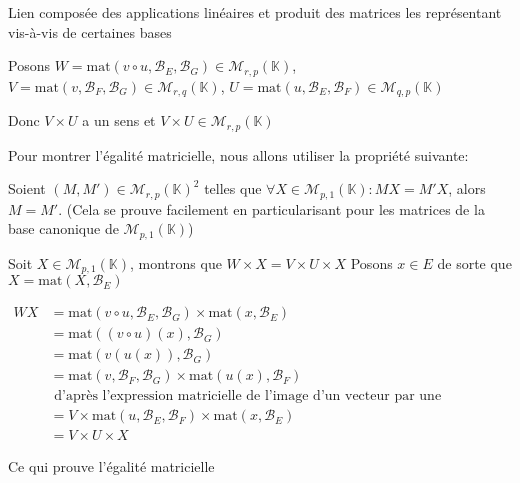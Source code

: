 \documentclass{article}
\begin{document}
\begin{question_kholle}
	[{Soient $E, F, G$, trois $\mathbb{K}$-espaces vectoriels de dimension finie $(p, q, r) \in (\mathbb{N}^{*})^{3}$
$\mathcal{B}_{E}, \mathcal{B}_{F}, \mathcal{B}_{G}$ des bases respectives de ces trois espaces vectoriels, et  $u \in \mathcal{L}_{\mathbb{K}}(E, F)$ $v \in \mathcal{L}_{\mathbb{K}}(F, G)$.
	
	Alors 
$$
	\mathrm{mat}(v \circ u, \mathcal{B}_{E}, \mathcal{B}_{G}) = \mathrm{mat}(v, \mathcal{B}_{F}, \mathcal{B}_{G}) \times \mathrm{mat}(u, \mathcal{B}_{E}, \mathcal{B}_{F})
$$}]{Lien composée des applications linéaires et produit des matrices les représentant vis-à-vis de certaines bases}
	
	Posons $W = \mathrm{mat}(v \circ u, \mathcal{B}_{E}, \mathcal{B}_{G}) \in \mathcal{M}_{r, p}(\mathbb{K})$, $V=\mathrm{mat}(v, \mathcal{B}_{F}, \mathcal{B}_{G}) \in \mathcal{M}_{r, q}(\mathbb{K})$, $U = \mathrm{mat}(u, \mathcal{B}_{E}, \mathcal{B}_{F}) \in \mathcal{M}_{q, p}(\mathbb{K})$
	
	Donc $V \times U$ a un sens et $V \times U \in \mathcal{M}_{r, p}(\mathbb{K})$
	
	Pour montrer l'égalité matricielle, nous allons utiliser la propriété suivante:
	
	Soient $(M, M') \in \mathcal{M}_{r, p}(\mathbb{K})^{2}$ telles que $\forall X \in \mathcal{M}_{p, 1}(\mathbb{K}): MX = M'X$, alors $M = M'$. (Cela se prouve facilement en particularisant pour les matrices de la base canonique de $\mathcal{M}_{p,1}(\mathbb{K})$)
	
	Soit $X \in \mathcal{M}_{p, 1}(\mathbb{K})$, montrons que $W \times X = V \times U \times X$
	Posons $x \in E$ de sorte que $X = \mathrm{mat}(X, \mathcal{B}_{E})$
	
	\begin{align*}
		WX &= \mathrm{mat}(v \circ  u, \mathcal{B}_{E}, \mathcal{B}_{G})\times \mathrm{ mat}(x, \mathcal{B}_{E}) \\
		&= \mathrm{mat}((v \circ  u)(x), \mathcal{B}_{G}) \\
		&= \mathrm{mat}(v(u(x)), \mathcal{B}_{G}) \\
		&= \mathrm{mat}(v, \mathcal{B}_{F}, \mathcal{B}_{G}) \times \mathrm{mat}(u(x), \mathcal{B}_{F}) \\
		&\text{ d'après l'expression matricielle de l'image d'un vecteur par une application linéaire}\\
		&= V \times \mathrm{mat}(u, \mathcal{B}_{E}, \mathcal{B}_{F})\times \mathrm{ mat }(x, \mathcal{B}_{E}) \\
		&= V\times U\times X
	\end{align*}
	
	Ce qui prouve l'égalité matricielle
\end{question_kholle}
\end{document}

